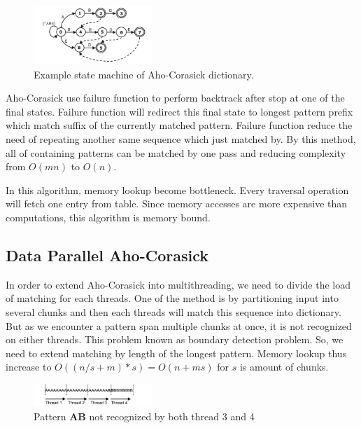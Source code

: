 \documentclass[conference]{IEEEtran}
\begin{document}
    \begin{figure}[htbp]
        \centerline{\includegraphics[width=0.4\textwidth]{../src/resources/aho-c.png}}
        \caption{Example state machine of Aho-Corasick dictionary.}
    \end{figure}

    Aho-Corasick use failure function to perform backtrack after stop at one of the final states. Failure function will redirect this final state to longest pattern prefix which match suffix of the currently matched pattern. Failure function reduce the need of repeating another same sequence which just matched by. By this method, all of containing patterns can be matched by one pass and reducing complexity from $O(mn)$ to $O(n)$. 

    In this algorithm, memory lookup become bottleneck. Every traversal operation will fetch one entry from table. Since memory accesses are more expensive than computations, this algorithm is memory bound.

    \subsection{Data Parallel Aho-Corasick}
    In order to extend Aho-Corasick into multithreading, we need to divide the load of matching for each threads. One of the method is by partitioning input into several chunks and then each threads will match this sequence into dictionary. But as we encounter a pattern span multiple chunks at once, it is not recognized on either threads. This problem known as boundary detection problem. So, we need to extend matching by length of the longest pattern. Memory lookup thus increase to $O((n/s + m) * s) = O(n + ms)$ for $s$ is amount of chunks. 

    \begin{figure}[htbp]
        \centerline{\includegraphics[width=0.4\textwidth]{../src/resources/boundary.png}}
        \caption{Pattern \textbf{AB} not recognized by both thread 3 and 4}
    \end{figure}
\end{document}
